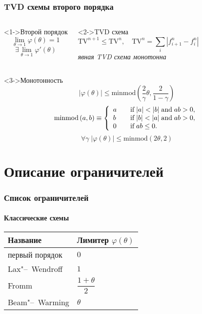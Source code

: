 \documentclass[ucs]{beamer}
\newcommand{\TV}{\mathrm{TV}}
\begin{document}
\begin{frame}
	\frametitle{TVD схемы второго порядка}
	\begin{columns}
		\begin{block}<1->{Второй порядок}
			\[ \lim_{\theta\to1}{\varphi(\theta)} = 1 \] \[ \exists \lim_{\theta\to1}{\varphi'(\theta)} \]
		\end{block}
		\begin{block}<2->{TVD схема}
			\[ \TV^{n+1}\le \TV^n, \quad \TV^n = \sum_i| f_{i+1}^n - f_i^n | \]
			\centering\emph{явная TVD схема монотонна}\\\smallskip
		\end{block}
	\end{columns}
		\begin{block}<3->{Монотонность}
			\[ |\varphi(\theta)| \leq \mathrm{minmod}\left(\frac2{\gamma}\theta,\frac2{1-\gamma}\right) \]
			\[
			\mathrm{minmod}\,(a,b) \equiv \left\{
			\begin{array}{l l}
				a & \quad \text{if}\;|a|<|b| \;\text{and}\;ab>0, \\
				b & \quad \text{if}\;|b|<|a| \;\text{and}\;ab>0, \\
				0 & \quad \text{if}\;ab \leq 0.
			\end{array}\right.
			\]
			\[ \forall \gamma \; |\varphi(\theta)| \leq \mathrm{minmod}\left(2\theta,2\right) \]
		\end{block}
\end{frame}

\section{Описание ограничителей}

\begin{frame}
	\frametitle{Список ограничителей}
	\framesubtitle{Классические схемы}
	\renewcommand\arraystretch{1.5}
	\begin{table}
		\begin{tabular}{>{\centering}p{3cm}|>{\centering}p{3cm}}
			\toprule
			Название		&  Лимитер \( \varphi(\theta) \) \tabularnewline
			\midrule
			первый порядок	& \( 0 \) \tabularnewline
			Lax"--~Wendroff	& \( 1 \) \tabularnewline
			Fromm			& \( \dfrac{1+\theta}2 \) \tabularnewline
			Beam"--~Warming	& \( \theta \) \tabularnewline
			\bottomrule
		\end{tabular}
	\end{table}
\end{frame}
\end{document}
